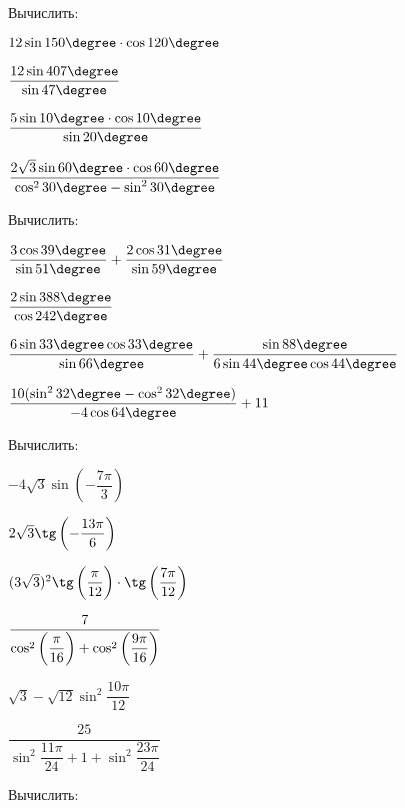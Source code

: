 \begin{listofex}
	\item Вычислить:
	\begin{enumcols}[itemcolumns=2]
		\item \( 12\sin150\degree\cdot\cos120\degree \) 
		\item \( \dfrac{12\sin407\degree}{\sin47\degree} \)
		\item \( \dfrac{5\sin10\degree\cdot\cos10\degree}{\sin20\degree} \)
		\item \( \dfrac{2\sqrt{3}\sin60\degree\cdot\cos60\degree}{\cos^2 30\degree - \sin^2 30\degree} \)
	\end{enumcols}
	\item Вычислить:
	\begin{enumcols}[itemcolumns=2]
		\item \( \dfrac{3\cos39\degree}{\sin51\degree}+\dfrac{2\cos31\degree}{\sin59\degree} \) 
		\item \( \dfrac{2\sin388\degree}{\cos242\degree} \) 
		\item \( \dfrac{6\sin33\degree\cos33\degree}{\sin66\degree}+\dfrac{\sin88\degree}{6\sin44\degree\cos44\degree} \) 
		\item \( \dfrac{10(\sin^2 32\degree-\cos^2 32\degree)}{-4\cos64\degree}+11 \) 
	\end{enumcols}
	\item Вычислить:
	\begin{enumcols}[itemcolumns=2]
		\item \( -4\sqrt{3}\sin\left( -\dfrac{7\pi}{3} \right) \) 
		\item \( 2\sqrt{3}\tg\left( -\dfrac{13\pi}{6} \right) \) 
		\item \( (3\sqrt{3})^2\tg\left( \dfrac{\vphantom{7}\pi}{12} \right)\cdot\tg\left( \dfrac{7\pi}{12} \right) \) 
		\item \( \dfrac{7}{\cos^2\left( \dfrac{\vphantom{9}\pi}{16} \right)+\cos^2\left( \dfrac{9\pi}{16} \right)} \) 
		\item \( \sqrt{3}-\sqrt{12}\sin^2\dfrac{10\pi}{12} \) 
		\item \( \dfrac{25}{\sin^2\dfrac{11\pi}{24}+1+\sin^2\dfrac{23\pi}{24}} \)
	\end{enumcols}
	\item Вычислить:
	\begin{enumcols}[itemcolumns=4]

\end{enumcols}
\end{listofex}
